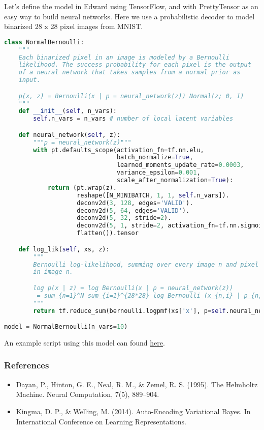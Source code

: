 Let's define the model in Edward using TensorFlow, and with
PrettyTensor as an easy way to build neural networks. Here we use a
probabilistic decoder to model binarized 28 x 28
pixel images from MNIST.
\begin{lstlisting}[language=Python]
class NormalBernoulli:
    """
    Each binarized pixel in an image is modeled by a Bernoulli
    likelihood. The success probability for each pixel is the output
    of a neural network that takes samples from a normal prior as
    input.

    p(x, z) = Bernoulli(x | p = neural_network(z)) Normal(z; 0, I)
    """
    def __init__(self, n_vars):
        self.n_vars = n_vars # number of local latent variables

    def neural_network(self, z):
        """p = neural_network(z)"""
        with pt.defaults_scope(activation_fn=tf.nn.elu,
                               batch_normalize=True,
                               learned_moments_update_rate=0.0003,
                               variance_epsilon=0.001,
                               scale_after_normalization=True):
            return (pt.wrap(z).
                    reshape([N_MINIBATCH, 1, 1, self.n_vars]).
                    deconv2d(3, 128, edges='VALID').
                    deconv2d(5, 64, edges='VALID').
                    deconv2d(5, 32, stride=2).
                    deconv2d(5, 1, stride=2, activation_fn=tf.nn.sigmoid).
                    flatten()).tensor

    def log_lik(self, xs, z):
        """
        Bernoulli log-likelihood, summing over every image n and pixel i
        in image n.

        log p(x | z) = log Bernoulli(x | p = neural_network(z))
         = sum_{n=1}^N sum_{i=1}^{28*28} log Bernoulli (x_{n,i} | p_{n,i})
        """
        return tf.reduce_sum(bernoulli.logpmf(xs['x'], p=self.neural_network(z)))

model = NormalBernoulli(n_vars=10)
\end{lstlisting}

An example script using this model can found
\href{https://github.com/blei-lab/edward/blob/master/examples/convolutional_vae.py}
{here}.

\subsubsection{References}\label{references}

\begin{itemize}
\item
  Dayan, P., Hinton, G. E., Neal, R. M., & Zemel, R. S. (1995). The Helmholtz Machine. Neural Computation, 7(5), 889–904.
\item
  Kingma, D. P., & Welling, M. (2014). Auto-Encoding Variational Bayes. In International Conference on Learning Representations.
\end{itemize}
